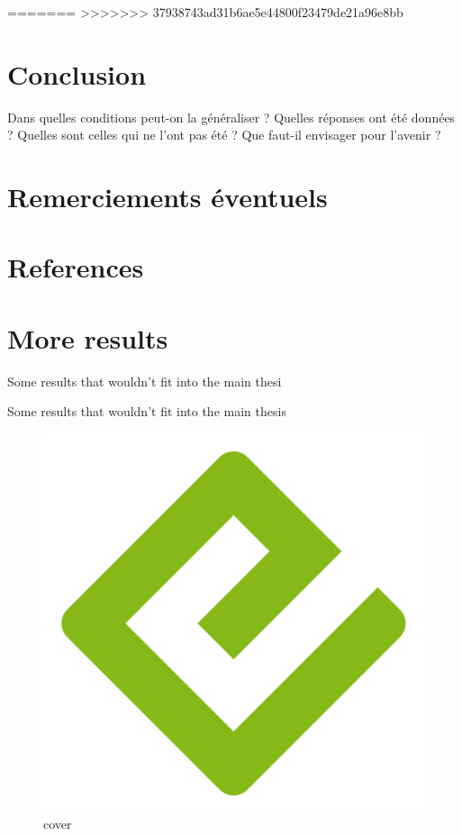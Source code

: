 \documentclass[
  a4paper,
]{scrbook}
\newlength{\cslhangindent}
\newlength{\cslentryspacingunit} %
\newenvironment{CSLReferences}[2] %
 {%
  \setlength{\parindent}{0pt}
  \ifodd #1
  \let\oldpar\par
  \def\par{\hangindent=\cslhangindent\oldpar}
  \fi
  \setlength{\parskip}{#2\cslentryspacingunit}
 }%
 {}
\begin{document}

=======
>>>>>>> 37938743ad31b6ae5e44800f23479de21a96e8bb
\hypertarget{conclusion}{%
\chapter{Conclusion}\label{conclusion}}

Dans quelles conditions peut-on la généraliser ? Quelles réponses ont
été données ? Quelles sont celles qui ne l'ont pas été ? Que faut-il
envisager pour l'avenir ?

\hypertarget{remerciements-uxe9ventuels}{%
\chapter{Remerciements éventuels}\label{remerciements-uxe9ventuels}}

\hypertarget{references}{%
\chapter*{References}\label{references}}

\hypertarget{refs}{}
\begin{CSLReferences}{0}{0}
\end{CSLReferences}

\appendix
{}

\hypertarget{sec-more-results}{%
\chapter{More results}\label{sec-more-results}}

Some results that wouldn't fit into the main thesi

Some results that wouldn't fit into the main thesis

\begin{figure}

{\centering \includegraphics{./cover.png}

}

\caption{cover}

\end{figure}


\backmatter
\end{document}
